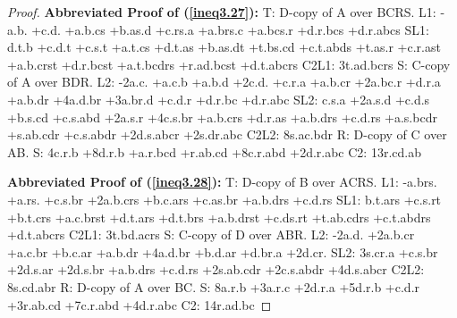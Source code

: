 \documentclass[10pt,journal]{IEEEtran}
\begin{document}
\begin{proof}
{\bf Abbreviated Proof of (\ref{ineq3.27}):}
T: D-copy of A over BCRS.\newline
L1: -a.b. +c.d. +a.b.cs +b.as.d +c.rs.a +a.brs.c +a.bcs.r +d.r.bcs +d.r.abcs\newline
SL1: d.t.b +c.d.t +c.s.t +a.t.cs +d.t.as +b.as.dt +t.bs.cd +c.t.abds +t.as.r +c.r.ast +a.b.crst +d.r.bcst +a.t.bcdrs +r.ad.bcst +d.t.abcrs
C2L1: 3t.ad.bcrs\newline
S: C-copy of A over BDR.\newline
L2: -2a.c. +a.c.b +a.b.d +2c.d. +c.r.a +a.b.cr +2a.bc.r +d.r.a +a.b.dr +4a.d.br +3a.br.d +c.d.r +d.r.bc +d.r.abc\newline
SL2: c.s.a +2a.s.d +c.d.s +b.s.cd +c.s.abd +2a.s.r +4c.s.br +a.b.crs +d.r.as +a.b.drs +c.d.rs +a.s.bcdr +s.ab.cdr +c.s.abdr +2d.s.abcr +2s.dr.abc\newline
C2L2: 8s.ac.bdr\newline
R: D-copy of C over AB.\newline
S: 4c.r.b +8d.r.b +a.r.bcd +r.ab.cd +8c.r.abd +2d.r.abc\newline
C2: 13r.cd.ab\newline

{\bf Abbreviated Proof of (\ref{ineq3.28}):}
T: D-copy of B over ACRS.\newline
L1: -a.brs. +a.rs. +c.s.br +2a.b.crs +b.c.ars +c.as.br +a.b.drs +c.d.rs\newline
SL1: b.t.ars +c.s.rt +b.t.crs +a.c.brst +d.t.ars +d.t.brs +a.b.drst +c.ds.rt +t.ab.cdrs +c.t.abdrs +d.t.abcrs
C2L1: 3t.bd.acrs\newline
S: C-copy of D over ABR.\newline
L2: -2a.d. +2a.b.cr +a.c.br +b.c.ar +a.b.dr +4a.d.br +b.d.ar +d.br.a +2d.cr.\newline
SL2: 3s.cr.a +c.s.br +2d.s.ar +2d.s.br +a.b.drs +c.d.rs +2s.ab.cdr +2c.s.abdr +4d.s.abcr\newline
C2L2: 8s.cd.abr\newline
R: D-copy of A over BC.\newline
S: 8a.r.b +3a.r.c +2d.r.a +5d.r.b +c.d.r +3r.ab.cd +7c.r.abd +4d.r.abc\newline
C2: 14r.ad.bc\newline



\end{proof}
\end{document}
